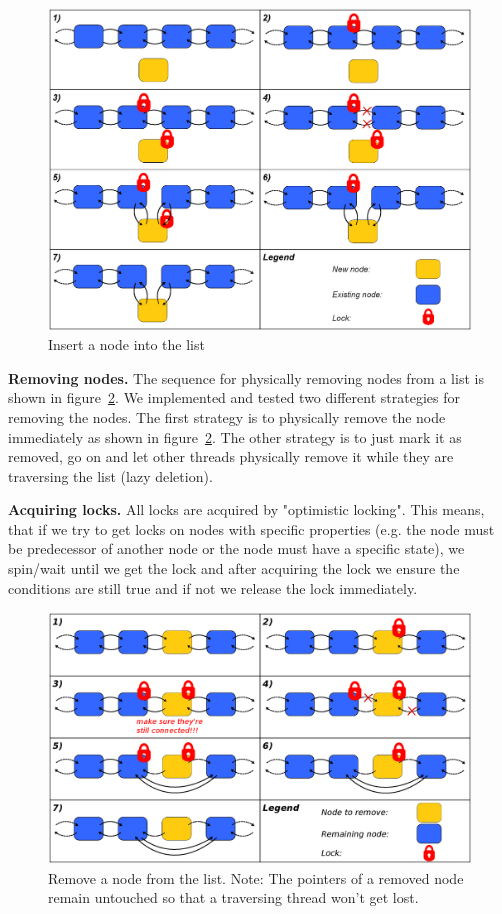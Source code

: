 \documentclass[letterpaper]{article}
\newcommand{\mypar}[1]{{\bf #1.}}
\begin{document}
\begin{figure}[h]\centering
  \includegraphics[scale=0.31]{insert.eps}
  \caption{Insert a node into the list \label{fig:insert}}
\end{figure}

\mypar{Removing nodes}
The sequence for physically removing nodes from a list is shown in  figure~\ref{fig:remove}. We implemented and tested two different strategies for removing the nodes. The first strategy is to physically remove the node immediately as shown in figure~\ref{fig:remove}. The other strategy is to just mark it as removed, go on and let other threads physically remove it while they are traversing the list (lazy deletion).

\mypar{Acquiring locks}
All locks are acquired by "optimistic locking". This means, that if we try to get locks on nodes with specific properties (e.g. the node must be predecessor of another node or the node must have a specific state), we spin/wait until we get the lock and after acquiring the lock we ensure the conditions are still true and if not we release the lock immediately.

\begin{figure}[h]\centering
  \includegraphics[scale=0.31]{remove.eps}
  \caption{Remove a node from the list. Note: The pointers of a removed node remain untouched so that a traversing thread won't get lost. \label{fig:remove}}
\end{figure}
\end{document}
